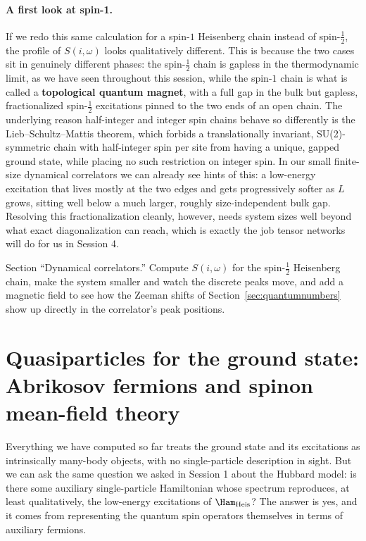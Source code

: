 \documentclass[all_sessions.tex]{subfiles}
\begin{document}
\paragraph{A first look at spin-1.} If we redo this same calculation for a spin-$1$ Heisenberg chain
instead of spin-$\tfrac12$, the profile of $S(i,\omega)$ looks qualitatively different. This is because
the two cases sit in genuinely different phases: the spin-$\tfrac12$ chain is gapless in the
thermodynamic limit, as we have seen throughout this session, while the spin-$1$ chain is what is called
a \textbf{topological quantum magnet}, with a full gap in the bulk but gapless, fractionalized
spin-$\tfrac12$ excitations pinned to the two ends of an open chain. The underlying reason half-integer
and integer spin chains behave so differently is the Lieb--Schultz--Mattis theorem, which forbids a
translationally invariant, SU(2)-symmetric chain with half-integer spin per site from having a unique,
gapped ground state, while placing no such restriction on integer spin. In our small finite-size
dynamical correlators we can already see hints of this: a low-energy excitation that lives mostly at the
two edges and gets progressively softer as $L$ grows, sitting well below a much larger, roughly
size-independent bulk gap. Resolving this fractionalization cleanly, however, needs system sizes well
beyond what exact diagonalization can reach, which is exactly the job tensor networks will do for us in
Session 4.

\begin{notebook}
Section ``Dynamical correlators.'' Compute $S(i,\omega)$ for the spin-$\tfrac12$ Heisenberg chain,
make the system smaller and watch the discrete peaks move, and add a magnetic field to see how the
Zeeman shifts of Section~\ref{sec:quantumnumbers} show up directly in the correlator's peak positions.
\end{notebook}

\section{Quasiparticles for the ground state: Abrikosov fermions and spinon mean-field theory}
\label{sec:spinon}
Everything we have computed so far treats the ground state and its excitations as intrinsically
many-body objects, with no single-particle description in sight. But we can ask the same question we
asked in Session 1 about the Hubbard model: is there some auxiliary single-particle Hamiltonian whose
spectrum reproduces, at least qualitatively, the low-energy excitations of $\Ham_{\mathrm{Heis}}$? The
answer is yes, and it comes from representing the quantum spin operators themselves in terms of
auxiliary fermions.
\end{document}
